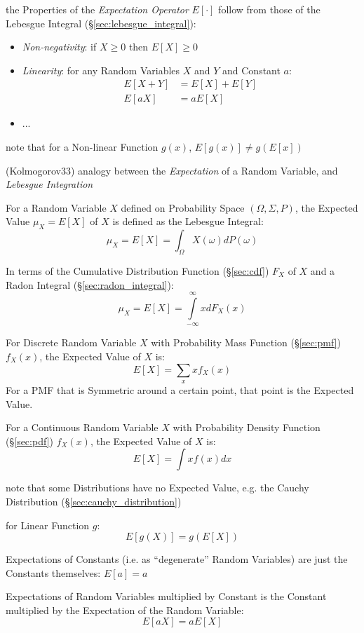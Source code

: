 the Properties of the \emph{Expectation Operator} $E[\cdot]$ follow from those
of the Lebesgue Integral (\S\ref{sec:lebesgue_integral}):

\begin{itemize}
  \item \emph{Non-negativity}: if $X \geq 0$ then $E[X] \geq 0$
  \item \emph{Linearity}: for any Random Variables $X$ and $Y$ and Constant $a$:
    \begin{align*}
      E[X + Y] & = E[X] + E[Y] \\
      E[aX]    & = a E[X]
    \end{align*}
  \item ...
\end{itemize}

note that for a Non-linear Function $g(x)$, $E[g(x)] \neq g(E[x])$

(Kolmogorov33) analogy between the \emph{Expectation} of a Random Variable, and
\emph{Lebesgue Integration}

For a Random Variable $X$ defined on Probability Space $(\Omega,\Sigma,P)$, the
Expected Value $\mu_X = E[X]$ of $X$ is defined as the Lebesgue Integral:
\[
  \mu_X = E[X] = \int_\Omega X(\omega) dP(\omega)
\]

In terms of the Cumulative Distribution Function (\S\ref{sec:cdf}) $F_X$ of $X$
and a Radon Integral (\S\ref{sec:radon_integral}):
\[
  \mu_X = E[X] = \int\limits_{-\infty}^{\infty} x dF_X(x)
\]

For Discrete Random Variable $X$ with Probability Mass Function
(\S\ref{sec:pmf}) $f_X(x)$, the Expected Value of $X$ is:
\[
  E[X] = \sum_x x f_X(x)
\]
For a PMF that is Symmetric around a certain point, that point is the Expected
Value.

For a Continuous Random Variable $X$ with Probability Density Function
(\S\ref{sec:pdf}) $f_X(x)$, the Expected Value of $X$ is:
\[
  E[X] = \int x f(x) dx
\]

note that some Distributions have no Expected Value, e.g. the Cauchy
Distribution (\S\ref{sec:cauchy_distribution})

for Linear Function $g$:
\[
  E[g(X)] = g(E[X])
\]

Expectations of Constants (i.e. as ``degenerate'' Random Variables) are just
the Constants themselves: $E[a] = a$

Expectations of Random Variables multiplied by Constant is the Constant
multiplied by the Expectation of the Random Variable:
\[
  E[aX] = aE[X]
\]

